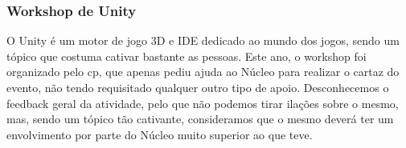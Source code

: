 
\subsubsection{Workshop de Unity}

O Unity é um motor de jogo 3D e IDE dedicado ao mundo dos jogos, sendo um tópico que costuma cativar bastante as pessoas. Este ano, o workshop foi organizado pelo \acrfull{cp}, que apenas pediu ajuda ao Núcleo para realizar o cartaz do evento, não tendo requisitado qualquer outro tipo de apoio. Desconhecemos o feedback geral da atividade, pelo que não podemos tirar ilações sobre o mesmo, mas, sendo um tópico tão cativante, consideramos que o mesmo deverá ter um envolvimento por parte do Núcleo muito superior ao que teve.
